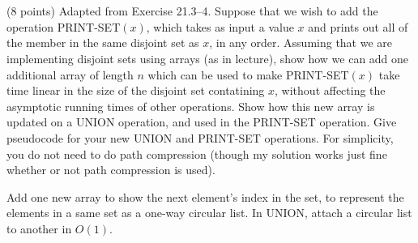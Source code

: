 \documentclass[paper=a4, fontsize=11pt]{scrartcl} %
\begin{document}
\maketitle %

\section{}

\begin{fancyquotes}
  (8 points) Adapted from Exercise 21.3--4. Suppose that we wish to add
  the operation \textsc{PRINT-SET}$(x)$, which takes as input a value
  $x$ and prints out all of the member in the same disjoint set as
  $x$, in any order. Assuming that we are implementing disjoint sets
  using arrays (as in lecture), show how we can add one additional
  array of length $n$ which can be used to make
  \textsc{PRINT-SET}$(x)$ take time linear in the size of the disjoint
  set contatining $x$, without affecting the asymptotic running times
  of other operations. Show how this new array is updated on a
  \textsc{UNION} operation, and used in the \textsc{PRINT-SET}
  operation. Give pseudocode for your new \textsc{UNION} and
  \textsc{PRINT-SET} operations. For simplicity, you do not need to do
  path compression (though my solution works just fine whether or not
  path compression is used).
\end{fancyquotes}

Add one new array to show the next element's index in the set, to
represent the elements in a same set as a one-way circular list. In
\textsc{UNION}, attach a circular list to another in $O(1)$.

\begin{algorithm}[hp]
\end{algorithm}


\pagebreak

\end{document}
